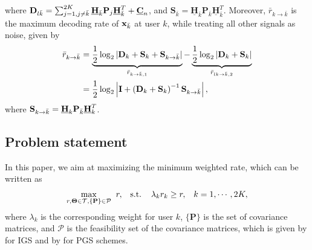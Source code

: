 \documentclass[a4, conference]{IEEEtran}
\theoremstyle{definition}
\begin{document}
where 
$\mathbf{D}_{l\bar{k}}%
=
\sum_{j= 1,j\neq \bar{k}}^{2K}
\underline{\mathbf{H}}_{\bar{k}}%
\mathbf{P}_{j}\underline{\mathbf{H}}_{\bar{k}}^T%
+
\underline{\bf C}_n
$, and $\mathbf{S}_{\bar{k}}=\underline{\mathbf{H}}_{\bar{k}}%
\mathbf{P}_{\bar{k}}
\underline{\mathbf{H}}_{\bar{k}}^T$.
Moreover, $\bar{r}_{k\rightarrow\bar{k}}$ is the maximum decoding rate of ${\bf x}_{\bar{k}}$ at  user $k$, while treating all other signals as noise, given by
\begin{align}%
\nonumber
\bar{r}_{k\rightarrow\bar{k}}&=
\underbrace{
\frac{1}{2}\log_2\left|{\bf D}_{k}%
+
{\bf S}_{k}
+
{\bf S}_{k\rightarrow\bar{k}}
\right|
}_{\bar{r}_{k\rightarrow\bar{k},1}%
}
-
\underbrace{
\frac{1}{2}\log_2\left|{\bf D}_{k}%
+
{\bf S}_{k} 
\right|
}_{\bar{r}_{lk\rightarrow\bar{k},2}%
}
\\
&
=\frac{1}{2}\log_2\left|{\bf I}+
\left({\bf D}_{k}%
+
{\bf S}_{k}
%
\right)^{-1}
 {\bf S}_{k\rightarrow\bar{k}}
\right|,
\label{eq-26}
\end{align}
where ${\bf S}_{k\rightarrow\bar{k}}=
\underline{{\bf H}}_{k}%
{\bf P}_{\bar{k}}\underline{{\bf H}}_{k}^T
$.

\subsection{Problem statement}
In this paper, we aim at maximizing the minimum weighted rate, which can be written as 
\begin{align}\label{opt}
\underset{
r,\bm{\Theta}\in\mathcal{T}, \{\mathbf{P}\}\in\mathcal{P}}
{\max} \hspace{0.2cm}&r,
&
\text{s.t.}\hspace{0.4cm}& \lambda_{k}r_{k}\geq r, & k=1,\cdots,2K,
\end{align}
where $\lambda_{k}$ is the corresponding weight for user $k$, $\{\mathbf{P}\}$ is the set of covariance matrices, and $\mathcal{P}$ is the feasibility set of the covariance matrices, which is given by \cite[Eq. (23)]{soleymani2022noma} for IGS and by \cite[Eq. (24)]{soleymani2022noma} for PGS schemes. 
\end{document}
